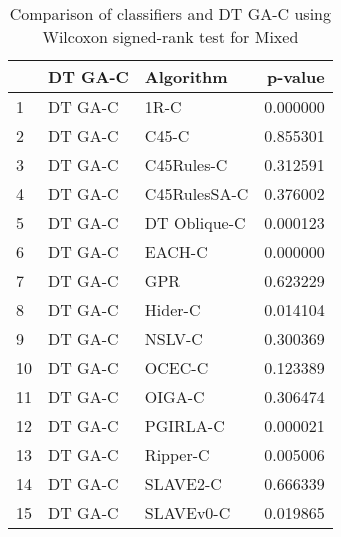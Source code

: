 \begin{table}
\footnotesize
\caption{Comparison of classifiers and DT GA-C using Wilcoxon signed-rank test for Mixed}
\label{tab:DT GA-C wilcoxon Mixed comparison}
\begin{tabular}{lllr}
\hline
 & DT GA-C & Algorithm & p-value \\
\hline
1 & DT GA-C & 1R-C & 0.000000 \\
2 & DT GA-C & C45-C & 0.855301 \\
3 & DT GA-C & C45Rules-C & 0.312591 \\
4 & DT GA-C & C45RulesSA-C & 0.376002 \\
5 & DT GA-C & DT Oblique-C & 0.000123 \\
6 & DT GA-C & EACH-C & 0.000000 \\
7 & DT GA-C & GPR & 0.623229 \\
8 & DT GA-C & Hider-C & 0.014104 \\
9 & DT GA-C & NSLV-C & 0.300369 \\
10 & DT GA-C & OCEC-C & 0.123389 \\
11 & DT GA-C & OIGA-C & 0.306474 \\
12 & DT GA-C & PGIRLA-C & 0.000021 \\
13 & DT GA-C & Ripper-C & 0.005006 \\
14 & DT GA-C & SLAVE2-C & 0.666339 \\
15 & DT GA-C & SLAVEv0-C & 0.019865 \\
\hline
\end{tabular}
\end{table}
